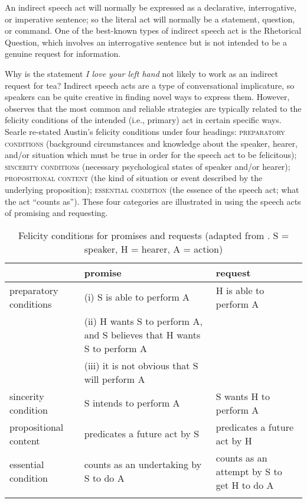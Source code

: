 An indirect speech act will normally be expressed as a declarative, interrogative, or imperative sentence; so the literal act will normally be a statement, question, or command. One of the best-known types of indirect speech act is the Rhetorical Question, which involves an interrogative sentence but is not intended to be a genuine request for information.





Why is the statement \textit{I love your left hand} not likely to work as an indirect request for tea? Indirect speech acts are a type of conversational implicature, so speakers can be quite creative in finding novel ways to express them. However,  \citet{Searle1969,Searle1975} observes that the most common and reliable strategies are typically related to the felicity conditions of the intended (i.e., primary) act in certain specific ways. Searle re-stated Austin’s felicity conditions under four headings: \textsc{preparatory conditions} (background circumstances and knowledge about the speaker, hearer, and\slash or situation which must be true in order for the speech act to be felicitous); \textsc{sincerity condition}s (necessary psychological states of speaker and/or hearer); \textsc{propositional content} (the kind of situation or event described by the underlying proposition); \textsc{essential condition} (the essence of the speech act; what the act “counts as”). These four categories are illustrated in  using the speech acts of promising and requesting.
 
\begin{table}[b]
\caption{Felicity conditions for promises and requests (adapted from \citealt{Searle1969,Searle1975}. S = speaker, H = hearer, A = action)\label{extab:10.7}}
\begin{tabularx}{\textwidth}{lQQ}
\lsptoprule
&   promise &   request\\\midrule
  preparatory conditions & (i) S is able to perform A & H is able to perform A\\
				         & (ii) H wants S to perform A, and S believes that H wants S to perform A\\
				         & (iii) it is not obvious that S will perform A  \\\tablevspace
  sincerity condition & S intends to perform A & S wants H to perform A\\\tablevspace
  propositional content & predicates a future act by S & predicates a future act by H\\\tablevspace
  essential condition & counts as an undertaking by S to do A & counts as an attempt by S to get H to do A\\
\lspbottomrule
\end{tabularx}
\end{table}



